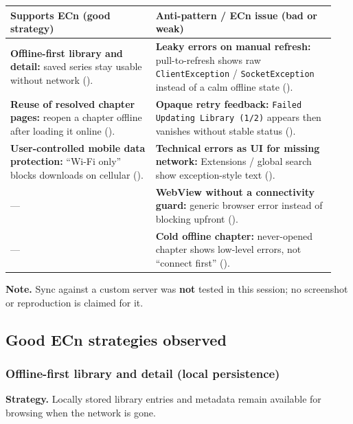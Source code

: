 \begin{center}
\begin{tabular}{@{}p{0.42\linewidth}p{0.52\linewidth}@{}}
\hline
\textbf{Supports ECn (good strategy)} & \textbf{Anti-pattern / ECn issue (bad or weak)} \\
\hline
\textbf{Offline-first library and detail:} saved series stay usable without network (\nameref{sec:ecn-good-library}). &
\textbf{Leaky errors on manual refresh:} pull-to-refresh shows raw \texttt{ClientException} / \texttt{SocketException} instead of a calm offline state (\nameref{sec:ecn-ap-pull}). \\
\hline
\textbf{Reuse of resolved chapter pages:} reopen a chapter offline after loading it online (\nameref{sec:ecn-good-cache}). &
\textbf{Opaque retry feedback:} \texttt{Failed Updating Library (1/2)} appears then vanishes without stable status (\nameref{sec:ecn-ap-retry}). \\
\hline
\textbf{User-controlled mobile data protection:} ``Wi-Fi only'' blocks downloads on cellular (\nameref{sec:ecn-good-wifi}). &
\textbf{Technical errors as UI for missing network:} Extensions / global search show exception-style text (\nameref{sec:ecn-ap-extensions}). \\
\hline
--- &
\textbf{WebView without a connectivity guard:} generic browser error instead of blocking upfront (\nameref{sec:ecn-ap-webview}). \\
\hline
--- &
\textbf{Cold offline chapter:} never-opened chapter shows low-level errors, not ``connect first'' (\nameref{sec:ecn-ap-cold}). \\
\hline
\end{tabular}
\end{center}

\noindent\textbf{Note.} Sync against a custom server was \textbf{not} tested in this session; no screenshot or reproduction is claimed for it.

\subsection{Good ECn strategies observed}
\label{sec:ecn-good}

\subsubsection{Offline-first library and detail (local persistence)}
\label{sec:ecn-good-library}
\textbf{Strategy.} Locally stored library entries and metadata remain available for browsing when the network is gone.

